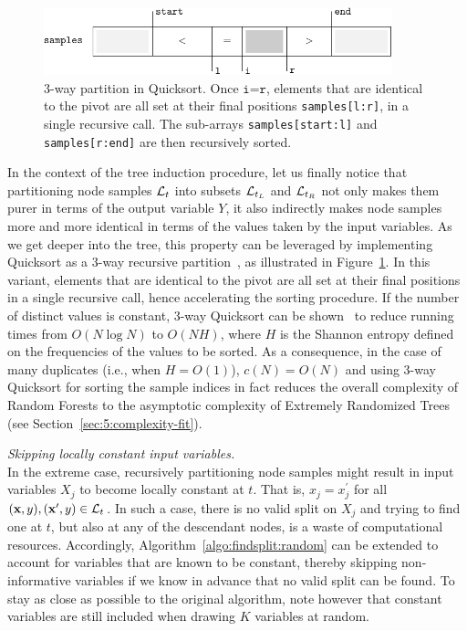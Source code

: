 \begin{description}
    \begin{figure}
        \centering
        \includegraphics[width=0.9\textwidth]{figures/ch5_sort.pdf}
        \caption{3-way partition in Quicksort. Once $\texttt{i=r}$, elements that are identical
                 to the pivot are all set at their final positions \texttt{samples[l:r]}, in a single
                 recursive call. The sub-arrays \texttt{samples[start:l]} and \texttt{samples[r:end]}
                 are then recursively sorted.}
        \label{fig:5:sort}
    \end{figure}

    In the context of the tree induction procedure, let us finally notice that
    partitioning node samples ${\cal L}_t$ into subsets ${\cal L}_{t_L}$ and
    ${\cal L}_{t_R}$ not only makes them purer in terms of the output variable
    $Y$, it also indirectly makes node samples more and more identical in terms
    of the values taken by the input variables. As we get deeper into the tree,
    this property can be leveraged by implementing Quicksort as a 3-way
    recursive partition~\citep{bentley:1993}, as illustrated in
    Figure~\ref{fig:5:sort}. In this variant, elements that are identical to
    the pivot are all set at their final positions in a single recursive call,
    hence accelerating the sorting procedure. If the number of distinct values
    is constant, 3-way Quicksort can be shown~\citep{sedgewick:2011}
    to reduce running times from $O(N \log N)$ to $O(N H)$, where $H$ is the
    Shannon entropy defined on the frequencies of the values to be sorted. As a
    consequence, in the case of many duplicates (i.e., when $H=O(1)$),
    $c(N)=O(N)$ and using 3-way Quicksort for sorting the sample indices in
    fact reduces the overall complexity of Random Forests to the asymptotic
    complexity of Extremely Randomized Trees (see Section~\ref{sec:5:complexity-fit}).

\item \textit{Skipping locally constant input variables.}\hfill \\
    In the extreme case, recursively partitioning node samples might result in
    input variables $X_j$ to become locally constant at $t$. That is,
    $x_j=x^\prime_j$ for all $(\mathbf{x},y), (\mathbf{x}^\prime, y) \in {\cal
    L}_t$. In such  a case, there is no valid split on $X_j$ and trying to find
    one at $t$, but also at any of the descendant nodes, is a waste of
    computational resources. Accordingly, Algorithm~\ref{algo:findsplit:random}
    can be extended to account for variables that are known to be constant, thereby skipping
    non-informative variables if we know in advance that no valid split can be found.
    To stay as close as possible to the original algorithm, note however that constant
    variables are still included when drawing $K$ variables at random.


\end{description}
